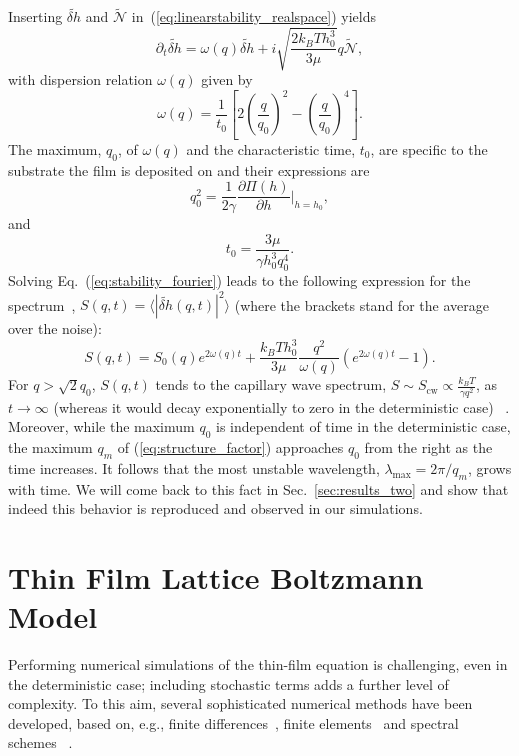 Inserting $\tilde{\delta h}$ and $\tilde{\mathcal{N}}$ in~(\ref{eq:linearstability_realspace}) yields
\begin{equation}\label{eq:stability_fourier}
    \partial_t \tilde{\delta h} = \omega(q)\tilde{\delta h} +i\sqrt{\frac{2k_BTh_0^3}{3\mu}}q\tilde{\mathcal{N}},
\end{equation}
with dispersion relation $\omega(q)$ given by
\begin{equation}\label{eq:dispersion}
    \omega(q) = \frac{1}{t_0}\left[2\left(\frac{q}{q_0}\right)^2 - \left(\frac{q}{q_0}\right)^4\right].
\end{equation}
The maximum, $q_0$, of $\omega(q)$ and the characteristic time, $t_0$, are specific to the substrate the film is deposited on and their expressions are~\cite{PhysRevLett.99.114503}
\begin{equation}\label{eq:q0}
    q_0^2 = \frac{1}{2\gamma}\frac{\partial \Pi(h)}{\partial h}\bigg\rvert_{h=h_0},
\end{equation}
and
\begin{equation}\label{eq:t0}
    t_0 = \frac{3\mu}{\gamma h_0^3 q_0^4}.
\end{equation}
Solving Eq.~(\ref{eq:stability_fourier}) leads to the following expression for the spectrum~\cite{PhysRevE.100.023108,Mecke_2005},
$S(q,t) = \langle |\tilde{\delta h}(q,t)|^2\rangle$ (where the brackets stand for the average over the noise):
\begin{equation}\label{eq:structure_factor}
    S(q,t) = S_0(q)e^{2\omega(q)t} + \frac{k_BTh_0^3}{3\mu}\frac{q^2}{\omega(q)}(e^{2\omega(q)t} - 1).
\end{equation}
For $q>\sqrt{2}q_0$, $S(q,t)$ tends to the capillary wave spectrum, 
$S \sim S_{\text{cw}} \propto \frac{k_BT}{\gamma q^2}$, as $t \rightarrow \infty$ (whereas it would decay exponentially to zero in the deterministic case) ~\cite{PhysRevLett.99.114503,Mecke_2005}.
Moreover, while the maximum $q_0$ is independent of time in the deterministic case, the maximum $q_m$ of 
(\ref{eq:structure_factor}) approaches $q_0$ from the right as the time increases.
It follows that the most unstable wavelength, $\lambda_{\text{max}} = 2\pi/q_m$, grows with time.
We will come back to this fact in Sec.~\ref{sec:results_two} and show that indeed this behavior is reproduced and observed in our simulations.

\section{Thin Film Lattice Boltzmann Model}\label{sec:num_method}
Performing numerical simulations of the thin-film equation is challenging, even in the deterministic case;
including stochastic terms adds a further level of complexity.
To this aim, several sophisticated numerical methods have been developed, based on, e.g.,   
finite differences~\cite{PhysRevE.63.011208}, finite elements~\cite{Grun2006} and spectral schemes~\cite{Duran_Olivencia2019} . 

